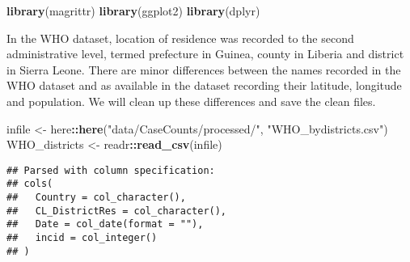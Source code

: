 \documentclass[11pt,]{article}
\title{}
\author{true}
\date{Y}
\newenvironment{Shaded}{\begin{snugshade}}{\end{snugshade}}
\newcommand{\KeywordTok}[1]{\textcolor[rgb]{0.13,0.29,0.53}{\textbf{#1}}}
\newcommand{\StringTok}[1]{\textcolor[rgb]{0.31,0.60,0.02}{#1}}
\newcommand{\OperatorTok}[1]{\textcolor[rgb]{0.81,0.36,0.00}{\textbf{#1}}}
\newcommand{\NormalTok}[1]{#1}
\begin{document}
\begin{Shaded}
\begin{Highlighting}[]
\KeywordTok{library}\NormalTok{(magrittr)}
\KeywordTok{library}\NormalTok{(ggplot2)}
\KeywordTok{library}\NormalTok{(dplyr)}
\end{Highlighting}
\end{Shaded}

In the WHO dataset, location of residence was recorded to the second
administrative level, termed prefecture in Guinea, county in Liberia and
district in Sierra Leone. There are minor differences between the names
recorded in the WHO dataset and as available in the dataset recording
their latitude, longitude and population. We will clean up these
differences and save the clean files.

\begin{Shaded}
\begin{Highlighting}[]
\NormalTok{infile <-}\StringTok{ }\NormalTok{here}\OperatorTok{::}\KeywordTok{here}\NormalTok{(}\StringTok{"data/CaseCounts/processed/"}\NormalTok{, }\StringTok{"WHO_bydistricts.csv"}\NormalTok{)}
\NormalTok{WHO_districts <-}\StringTok{ }\NormalTok{readr}\OperatorTok{::}\KeywordTok{read_csv}\NormalTok{(infile) }
\end{Highlighting}
\end{Shaded}

\begin{verbatim}
## Parsed with column specification:
## cols(
##   Country = col_character(),
##   CL_DistrictRes = col_character(),
##   Date = col_date(format = ""),
##   incid = col_integer()
## )
\end{verbatim}
\end{document}
